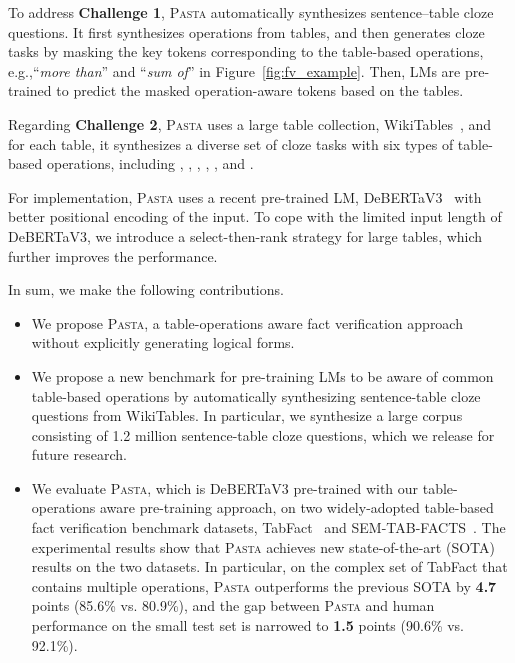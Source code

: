 \documentclass[11pt]{article}
\newcommand{\pasta}{\textsc{Pasta}\xspace}
\newcommand{\eg}{{e.g.,}\xspace}
\newcommand{\term}[1]{\xspace}
\begin{document}
To address {\bf Challenge 1}, \pasta automatically synthesizes sentence--table cloze questions. It first synthesizes operations from tables, and then generates cloze tasks by masking the key tokens corresponding to the table-based operations, \eg ``\emph{more than}'' and ``\emph{sum of}'' in Figure~\ref{fig:fv_example}. Then, LMs are pre-trained to predict the masked operation-aware tokens based on the tables.

Regarding {\bf Challenge 2}, \pasta uses a large table collection, WikiTables~\cite{wikitables}, and for each table, it synthesizes a diverse set of cloze tasks with six types of table-based operations, including \term{Filter}, \term{Aggregation}, \term{Superlative}, \term{Comparative}, \term{Ordinal}, and \term{Unique}. 









For implementation, \pasta uses a recent pre-trained LM, DeBERTaV3~\cite{debertav3,deberta} with better positional encoding of the input.
To cope with the limited input length of DeBERTaV3, we introduce a {select-then-rank} strategy for large tables, which further improves the performance.








In sum, we make the following contributions.

\begin{itemize}
    \item We propose \pasta, a table-operations aware fact verification approach without explicitly generating logical forms.
    \item We propose a new benchmark for pre-training LMs to be aware of common table-based operations by automatically synthesizing sentence-table cloze questions from WikiTables. In particular, we synthesize a large corpus consisting of 1.2 million sentence-table cloze questions, which we release for future research.
    \item We evaluate \pasta, which is DeBERTaV3 pre-trained with our table-operations aware pre-training approach, on two widely-adopted table-based fact verification benchmark datasets, TabFact~\cite{tabfact} and SEM-TAB-FACTS~\cite{semtabfact}. The experimental results show that \pasta achieves new state-of-the-art (SOTA) results on the two datasets. In particular, on the complex set of TabFact that contains multiple operations, \pasta outperforms the previous SOTA by {\bf 4.7} points (85.6\% vs. 80.9\%), and the gap between \pasta and human performance on the small test set is narrowed to {\bf 1.5} points (90.6\% vs. 92.1\%).
\end{itemize}
\end{document}
